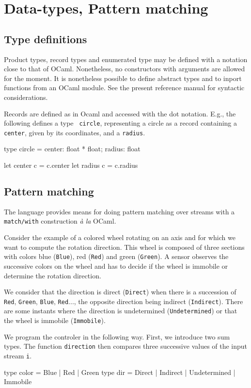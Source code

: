 \documentclass[11pt,titlepage,twoside]{report}
\newcommand{\ocaml}{{\sf OCaml}}
\begin{document}
\section{Data-types, Pattern matching}

\subsection{Type definitions}
Product types, record types and enumerated type may be defined with a
notation close to that of \ocaml. Nonetheless, no constructors with
arguments are allowed for the moment. It is nonetheless possible to
define abstract types and to inport functions from an \ocaml{} module.
See the present reference manual for syntactic considerations.

Records are defined as in Ocaml and accessed with the dot notation. E.g.,
the following defines a type {\tt
  circle}, representing a circle as a record containing a {\tt
  center}, given by its coordinates, and a {\tt radius}.
\begin{runverbatim}
type circle = { center: float * float; radius: float }

let center c = c.center
let radius c = c.radius
\end{runverbatim}
  
\subsection{Pattern matching}
The language provides means for doing pattern matching over streams
with a \verb-match/with- construction {\em \`a la} \ocaml.

Consider the example of a colored wheel rotating on an axis and for
which we want to compute the rotation direction. This wheel is
composed of three sections with colors blue (\verb-Blue-), red
(\verb-Red-) and green (\verb-Green-).  A sensor observes the
successive colors on the wheel and has to decide if the wheel is
immobile or determine the rotation direction.

We consider that the direction is direct (\verb-Direct-) when there is
a succession of \verb-Red-, \verb-Green-, \verb-Blue-, \verb-Red-...,
the opposite direction being indirect (\verb-Indirect-). There are
some instants where the direction is undetermined
(\verb-Undetermined-) or that the wheel is immobile (\verb-Immobile-).

We program the controler in the following way. First, we introduce two
sum types.  The function \verb-direction- then compares three
successive values of the input stream \verb-i-.
\begin{runverbatim}
type color = Blue | Red | Green
type dir = Direct | Indirect | Undetermined | Immobile
\end{runverbatim}
\end{document}
